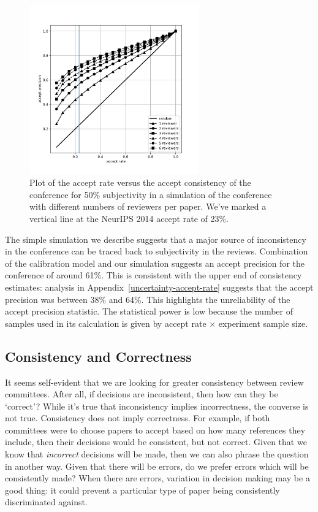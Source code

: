 \documentclass[twoside]{article}
\begin{document}
\begin{figure}[htb]
\centering
\includegraphics[width=0.65\textwidth]{diagrams/neurips/accept-precision-vs-accept-rate.pdf}

\caption{Plot of the accept rate versus the accept consistency of the
  conference for 50\% subjectivity in a simulation of the conference
  with different numbers of reviewers per paper. We've marked a vertical line at the NeurIPS 2014 accept rate of 23\%.}
\label{figure-consistency-vs-accept-rate}
\end{figure}

The simple simulation we describe suggests that a major source of
inconsistency in the conference can be traced back to subjectivity in
the reviews. Combination of the calibration model and our simulation
suggests an accept precision for the conference of around 61\%. This
is consistent with the upper end of consistency estimates: analysis in Appendix~\ref{uncertainty-accept-rate}
suggests that the accept precision was between 38\% and 64\%. This highlights the
unreliability of the accept precision statistic. The statistical power
is low because the number of samples used in its calculation is given
by accept rate $\times$ experiment sample size.

\subsection{Consistency and Correctness}

It seems self-evident that we are looking for greater consistency between review
committees. After all, if decisions are inconsistent, then how can
they be `correct'? While it's true that inconsistency implies
incorrectness, the converse is not true. Consistency does not imply
correctness. For example, if both committees were to choose papers to
accept based on how many references they include, then their decisions
would be consistent, but not correct. Given that we know that
\emph{incorrect} decisions will be made, then we can also phrase the
question in another way. Given that there will be errors, do we prefer
errors which will be consistently made? When there are errors,
variation in decision making may be a good thing: it could prevent a
particular type of paper being consistently discriminated against.
\end{document}
